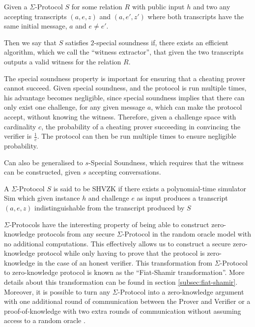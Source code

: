 \begin{definition}
Given a $\Sigma$-Protocol $S$ for some relation $R$ with public input $h$
and two any accepting transcripts $(a,e,z)$ and $(a,e',z')$
where both transcripts have the same initial message, $a$ and $e \neq e'$.

Then we say that $S$ satisfies $2$-special soundness if, there exists an
efficient algorithm, which we call the ``witness extractor'',
that given the two transcripts outputs a valid witness for the relation $R$.
\end{definition}

The special soundness property is important for ensuring that a cheating prover
cannot succeed. Given special soundness, and the protocol is run multiple times,
his advantage becomes negligible, since special soundness implies that there can
only exist one challenge, for any given message $a$, which can make the
protocol accept, without knowing the witness. Therefore, given a challenge space
with cardinality $c$, the probability of a cheating prover succeeding in
convincing the verifier is $\frac{1}{c}$. The protocol can then be run multiple
times to ensure negligible probability.

Can also be generalised to $s$-Special Soundness, which requires that the
witness can be constructed, given $s$ accepting conversations.

\begin{definition}[SHVZK]
  A $\Sigma$-Protocol $S$ is said to be SHVZK if there exists a polynomial-time
  simulator Sim which given instance $h$ and challenge $e$ as input produces a
  transcript $(a,e,z)$ indistinguishable from the transcript produced by $S$
\end{definition}

$\Sigma$-Protocols have the interesting property of being able to construct
zero-knowledge protocols from any secure $\Sigma$-Protocol in the random oracle
model with no additional computations. This effectively allows us to construct a
secure zero-knowledge protocol while only having to prove that the protocol is
zero-knowledge in the case of an honest verifier. This transformation from
$\Sigma$-Protocol to zero-knowledge protocol is known as the ``Fiat-Shamir
transformation''. More details about this transformation can be found in section
\ref{subsec:fiat-shamir}.
Moreover, it is possible to turn any $\Sigma$-Protocol into a zero-knowledge
argument with one additional round of communication between the Prover and
Verifier or a proof-of-knowledge with two extra rounds of communication without
assuming access to a random oracle \cite{on-sigma-protocols}.



